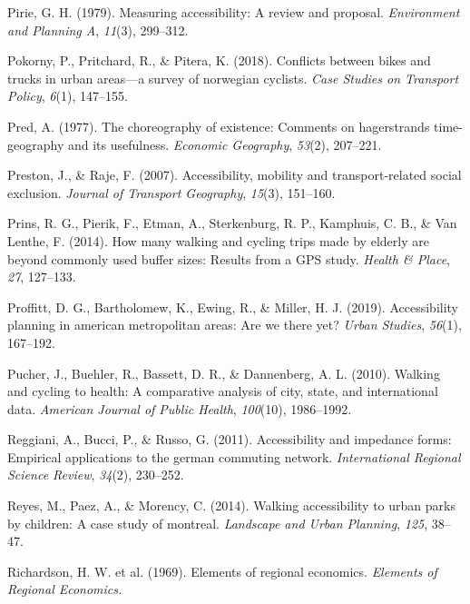 \documentclass[
11pt, %
oneside, %
english, %
singlespacing, %
]{macthesis} %
\newlength{\cslhangindent}
\newenvironment{CSLReferences}[2] %
 {%
  \setlength{\parindent}{0pt}
  \ifodd #1 \everypar{\setlength{\hangindent}{\cslhangindent}}\ignorespaces\fi
  \ifnum #2 > 0
  \setlength{\parskip}{#2\baselineskip}
  \fi
 }%
 {}
\begin{document}
\begin{CSLReferences}{1}{0}
Pirie, G. H. (1979). Measuring accessibility: A review and proposal. \emph{Environment and Planning A}, \emph{11}(3), 299--312.

Pokorny, P., Pritchard, R., \& Pitera, K. (2018). Conflicts between bikes and trucks in urban areas---a survey of norwegian cyclists. \emph{Case Studies on Transport Policy}, \emph{6}(1), 147--155.

Pred, A. (1977). The choreography of existence: Comments on hagerstrands time-geography and its usefulness. \emph{Economic Geography}, \emph{53}(2), 207--221.

Preston, J., \& Raje, F. (2007). Accessibility, mobility and transport-related social exclusion. \emph{Journal of Transport Geography}, \emph{15}(3), 151--160.

Prins, R. G., Pierik, F., Etman, A., Sterkenburg, R. P., Kamphuis, C. B., \& Van Lenthe, F. (2014). How many walking and cycling trips made by elderly are beyond commonly used buffer sizes: Results from a GPS study. \emph{Health \& Place}, \emph{27}, 127--133.

Proffitt, D. G., Bartholomew, K., Ewing, R., \& Miller, H. J. (2019). Accessibility planning in american metropolitan areas: Are we there yet? \emph{Urban Studies}, \emph{56}(1), 167--192.

Pucher, J., Buehler, R., Bassett, D. R., \& Dannenberg, A. L. (2010). Walking and cycling to health: A comparative analysis of city, state, and international data. \emph{American Journal of Public Health}, \emph{100}(10), 1986--1992.

Reggiani, A., Bucci, P., \& Russo, G. (2011). Accessibility and impedance forms: Empirical applications to the german commuting network. \emph{International Regional Science Review}, \emph{34}(2), 230--252.

Reyes, M., Paez, A., \& Morency, C. (2014). Walking accessibility to urban parks by children: A case study of montreal. \emph{Landscape and Urban Planning}, \emph{125}, 38--47.

Richardson, H. W. et al. (1969). Elements of regional economics. \emph{Elements of Regional Economics.}


\end{CSLReferences}
\end{document}
